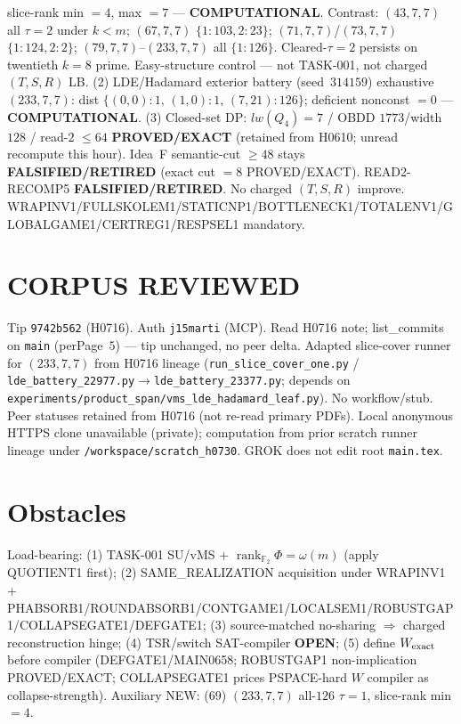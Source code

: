 \documentclass[11pt]{article}
\begin{document}
slice-rank min $=4$, max $=7$ --- \textbf{COMPUTATIONAL}.
Contrast: $(43,7,7)$ all $\tau{=}2$ under $k{<}m$; $(67,7,7)$ $\{1{:}103,2{:}23\}$;
$(71,7,7)$/$(73,7,7)$ $\{1{:}124,2{:}2\}$; $(79,7,7)$--$(233,7,7)$ all $\{1{:}126\}$.
Cleared-$\tau{=}2$ persists on twentieth $k{=}8$ prime. Easy-structure control --- not TASK-001,
not charged $(T,S,R)$ LB.
(2) LDE/Hadamard exterior battery (seed~$314159$) exhaustive $(233,7,7)$:
dist $\{(0,0){:}1,\,(1,0){:}1,\,(7,21){:}126\}$; deficient nonconst $=0$ --- \textbf{COMPUTATIONAL}.
(3) Closed-set DP: $lw(Q_4)=7$ / OBDD $1773$/width $128$ / read-$2$ $\le64$
\textbf{PROVED/EXACT} (retained from H0610; unread recompute this hour).
Idea~F semantic-cut $\ge48$ stays \textbf{FALSIFIED/RETIRED} (exact cut $=8$ PROVED/EXACT).
READ2-RECOMP5 \textbf{FALSIFIED/RETIRED}. No charged $(T,S,R)$ improve.
WRAPINV1/FULLSKOLEM1/STATICNP1/BOTTLENECK1/TOTALENV1/GLOBALGAME1/CERTREG1/RESPSEL1 mandatory.

\section*{CORPUS REVIEWED}
Tip \texttt{9742b562} (H0716). Auth \texttt{j15marti} (MCP).
Read H0716 note; list\_commits on \texttt{main} (perPage~$5$) --- tip unchanged, no peer delta.
Adapted slice-cover runner for $(233,7,7)$ from H0716 lineage
(\texttt{run\_slice\_cover\_one.py} / \texttt{lde\_battery\_22977.py}$\to$\texttt{lde\_battery\_23377.py};
depends on \texttt{experiments/product\_span/vms\_lde\_hadamard\_leaf.py}).
No workflow/stub. Peer statuses retained from H0716 (not re-read primary PDFs).
Local anonymous HTTPS clone unavailable (private);
computation from prior scratch runner lineage under \texttt{/workspace/scratch\_h0730}.
GROK does not edit root \texttt{main.tex}.

\section*{Obstacles}
Load-bearing: (1) TASK-001 SU/vMS + $\operatorname{rank}_{\mathbb F_2}\Phi=\omega(m)$ (apply QUOTIENT1 first);
(2) SAME\_REALIZATION acquisition under WRAPINV1 + PHABSORB1/ROUNDABSORB1/CONTGAME1/LOCALSEM1/ROBUSTGAP1/COLLAPSEGATE1/DEFGATE1;
(3) source-matched no-sharing $\Rightarrow$ charged reconstruction hinge;
(4) TSR/switch SAT-compiler \textbf{OPEN};
(5) define $W_{\rm exact}$ before compiler (DEFGATE1/MAIN0658; ROBUSTGAP1 non-implication PROVED/EXACT;
COLLAPSEGATE1 prices PSPACE-hard $W$ compiler as collapse-strength).
Auxiliary NEW: (69) $(233,7,7)$ all-$126$ $\tau{=}1$, slice-rank min $=4$.
\end{document}
